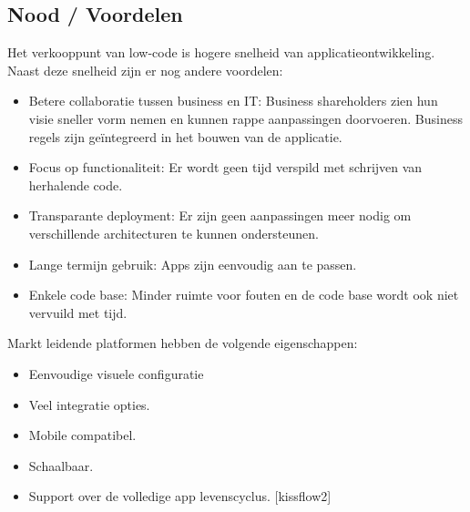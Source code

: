 \subsection{Nood / Voordelen}

Het verkooppunt van low-code is hogere snelheid van applicatieontwikkeling. Naast deze snelheid zijn er nog andere voordelen:
\begin{itemize}
    \item Betere collaboratie tussen business en IT: Business shareholders zien hun visie sneller vorm nemen en kunnen rappe aanpassingen doorvoeren. Business regels zijn geïntegreerd in het bouwen van de applicatie.
    \item Focus op functionaliteit: Er wordt geen tijd verspild met schrijven van herhalende code.
    \item Transparante deployment: Er zijn geen aanpassingen meer nodig om verschillende architecturen te kunnen ondersteunen.
    \item Lange termijn gebruik: Apps zijn eenvoudig aan te passen.
    \item Enkele code base: Minder ruimte voor fouten en de code base wordt ook niet vervuild met tijd.
\end{itemize}

Markt leidende platformen hebben de volgende eigenschappen:
\begin{itemize}
    \item Eenvoudige visuele configuratie
    \item Veel integratie opties.
    \item Mobile compatibel.
    \item Schaalbaar.
    \item Support over de volledige app levenscyclus. [kissflow2]
\end{itemize}

